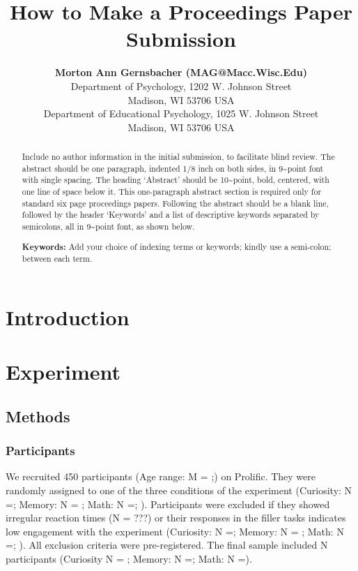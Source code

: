 \documentclass[10pt, letterpaper]{article}
\title{How to Make a Proceedings Paper Submission}
\author{{\large \bf Morton Ann Gernsbacher (MAG@Macc.Wisc.Edu)} \\ Department of Psychology, 1202 W. Johnson Street \\ Madison, WI 53706 USA \AND {\large \bf Sharon J.~Derry (SDJ@Macc.Wisc.Edu)} \\ Department of Educational Psychology, 1025 W. Johnson Street \\ Madison, WI 53706 USA}
\begin{document}
\maketitle

\begin{abstract}
Include no author information in the initial submission, to facilitate
blind review. The abstract should be one paragraph, indented 1/8 inch on
both sides, in 9\textasciitilde point font with single spacing. The
heading `Abstract' should be 10\textasciitilde point, bold, centered,
with one line of space below it. This one-paragraph abstract section is
required only for standard six page proceedings papers. Following the
abstract should be a blank line, followed by the header `Keywords' and a
list of descriptive keywords separated by semicolons, all in
9\textasciitilde point font, as shown below.

\textbf{Keywords:}
Add your choice of indexing terms or keywords; kindly use a semi-colon;
between each term.
\end{abstract}

\hypertarget{introduction}{%
\section{Introduction}\label{introduction}}

\hypertarget{experiment}{%
\section{Experiment}\label{experiment}}

\hypertarget{methods}{%
\subsection{Methods}\label{methods}}

\hypertarget{participants}{%
\subsubsection{Participants}\label{participants}}

We recruited 450 participants (Age range: M = ;) on Prolific. They were
randomly assigned to one of the three conditions of the experiment
(Curiosity: N =; Memory: N = ; Math: N =; ). Participants were excluded
if they showed irregular reaction times (N = ???) or their responses in
the filler tasks indicates low engagement with the experiment
(Curiosity: N =; Memory: N = ; Math: N =; ). All exclusion criteria were
pre-registered. The final sample included N participants (Curiosity N =
; Memory: N =; Math: N =).
\end{document}
